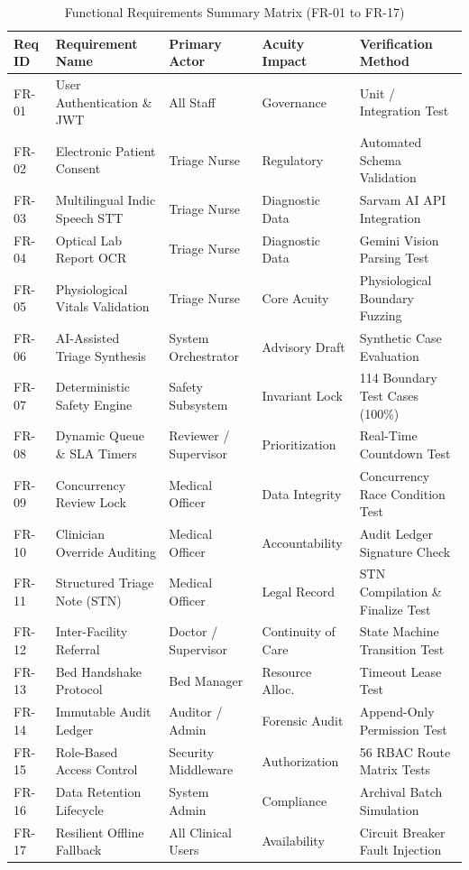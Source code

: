 \documentclass[11pt,a4paper,oneside]{report}
\begin{document}
\begin{table}[htbp]
  \centering
  \small
  \caption{Functional Requirements Summary Matrix (FR-01 to FR-17)}
  \label{tab:req_matrix}
  \begin{tabularx}{\textwidth}{lp{4.2cm}p{2.6cm}p{2.2cm}X}
    \toprule
    \textbf{Req ID} & \textbf{Requirement Name} & \textbf{Primary Actor} & \textbf{Acuity Impact} & \textbf{Verification Method} \\
    \midrule
    FR-01 & User Authentication \& JWT & All Staff & Governance & Unit / Integration Test \\
    FR-02 & Electronic Patient Consent & Triage Nurse & Regulatory & Automated Schema Validation \\
    FR-03 & Multilingual Indic Speech STT & Triage Nurse & Diagnostic Data & Sarvam AI API Integration \\
    FR-04 & Optical Lab Report OCR & Triage Nurse & Diagnostic Data & Gemini Vision Parsing Test \\
    FR-05 & Physiological Vitals Validation & Triage Nurse & Core Acuity & Physiological Boundary Fuzzing \\
    FR-06 & AI-Assisted Triage Synthesis & System Orchestrator & Advisory Draft & Synthetic Case Evaluation \\
    FR-07 & Deterministic Safety Engine & Safety Subsystem & Invariant Lock & 114 Boundary Test Cases (100\%) \\
    FR-08 & Dynamic Queue \& SLA Timers & Reviewer / Supervisor & Prioritization & Real-Time Countdown Test \\
    FR-09 & Concurrency Review Lock & Medical Officer & Data Integrity & Concurrency Race Condition Test \\
    FR-10 & Clinician Override Auditing & Medical Officer & Accountability & Audit Ledger Signature Check \\
    FR-11 & Structured Triage Note (STN) & Medical Officer & Legal Record & STN Compilation \& Finalize Test \\
    FR-12 & Inter-Facility Referral & Doctor / Supervisor & Continuity of Care & State Machine Transition Test \\
    FR-13 & Bed Handshake Protocol & Bed Manager & Resource Alloc. & Timeout Lease Test \\
    FR-14 & Immutable Audit Ledger & Auditor / Admin & Forensic Audit & Append-Only Permission Test \\
    FR-15 & Role-Based Access Control & Security Middleware & Authorization & 56 RBAC Route Matrix Tests \\
    FR-16 & Data Retention Lifecycle & System Admin & Compliance & Archival Batch Simulation \\
    FR-17 & Resilient Offline Fallback & All Clinical Users & Availability & Circuit Breaker Fault Injection \\
    \bottomrule
  \end{tabularx}
\end{table}
\end{document}
